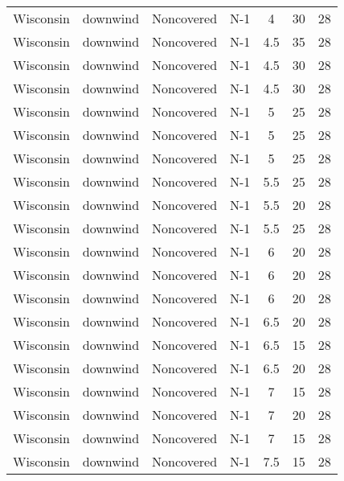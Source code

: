 \documentclass{article}
\begin{document}
\begin{longtable}[c]{ccccccc}
Wisconsin & downwind  & Noncovered & N-1             & 4            & 30          & 28  \\
Wisconsin & downwind  & Noncovered & N-1             & 4.5          & 35          & 28  \\
Wisconsin & downwind  & Noncovered & N-1             & 4.5          & 30          & 28  \\
Wisconsin & downwind  & Noncovered & N-1             & 4.5          & 30          & 28  \\
Wisconsin & downwind  & Noncovered & N-1             & 5            & 25          & 28  \\
Wisconsin & downwind  & Noncovered & N-1             & 5            & 25          & 28  \\
Wisconsin & downwind  & Noncovered & N-1             & 5            & 25          & 28  \\
Wisconsin & downwind  & Noncovered & N-1             & 5.5          & 25          & 28  \\
Wisconsin & downwind  & Noncovered & N-1             & 5.5          & 20          & 28  \\
Wisconsin & downwind  & Noncovered & N-1             & 5.5          & 25          & 28  \\
Wisconsin & downwind  & Noncovered & N-1             & 6            & 20          & 28  \\
Wisconsin & downwind  & Noncovered & N-1             & 6            & 20          & 28  \\
Wisconsin & downwind  & Noncovered & N-1             & 6            & 20          & 28  \\
Wisconsin & downwind  & Noncovered & N-1             & 6.5          & 20          & 28  \\
Wisconsin & downwind  & Noncovered & N-1             & 6.5          & 15          & 28  \\
Wisconsin & downwind  & Noncovered & N-1             & 6.5          & 20          & 28  \\
Wisconsin & downwind  & Noncovered & N-1             & 7            & 15          & 28  \\
Wisconsin & downwind  & Noncovered & N-1             & 7            & 20          & 28  \\
Wisconsin & downwind  & Noncovered & N-1             & 7            & 15          & 28  \\
Wisconsin & downwind  & Noncovered & N-1             & 7.5          & 15          & 28  \\

\end{longtable}
\end{document}

